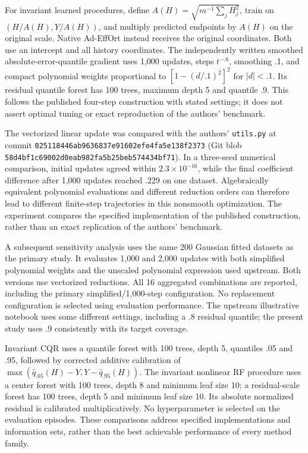 \documentclass[10pt]{article}
\begin{document}
For invariant learned procedures, define $A(H)=\sqrt{m^{-1}\sum_jH_j^2}$, train on $(H/A(H),Y/A(H))$, and multiply predicted endpoints by $A(H)$ on the original scale. Native Ad-EffOrt instead receives the original coordinates. Both use an intercept and all history coordinates. The independently written smoothed absolute-error-quantile gradient uses 1,000 updates, steps $t^{-.6}$, smoothing .1, and compact polynomial weights proportional to $[1-(d/.1)^2]^2$ for $|d|<.1$. Its residual quantile forest has 100 trees, maximum depth 5 and quantile .9. This follows the published four-step construction with stated settings; it does not assert optimal tuning or exact reproduction of the authors' benchmark.

The vectorized linear update was compared with the authors' \texttt{utils.py} at commit
\nolinkurl{025118446ab9636837e91602efe4fa5e138f2373}
(Git blob \nolinkurl{58d4bf1c69002d0eab982fa5b25beb574434bf71}). In a three-seed numerical comparison, initial updates agreed within $2.3\times10^{-16}$, while the final coefficient difference after 1,000 updates reached .229 on one dataset. Algebraically equivalent polynomial evaluations and different reduction orders can therefore lead to different finite-step trajectories in this nonsmooth optimization. The experiment compares the specified implementation of the published construction, rather than an exact replication of the authors' benchmark.

A subsequent sensitivity analysis uses the same 200 Gaussian fitted datasets as the primary study. It evaluates 1,000 and 2,000 updates with both simplified polynomial weights and the unscaled polynomial expression used upstream. Both versions use vectorized reductions. All 16 aggregated combinations are reported, including the primary simplified/1,000-step configuration. No replacement configuration is selected using evaluation performance. The upstream illustrative notebook uses some different settings, including a .8 residual quantile; the present study uses .9 consistently with its target coverage.

Invariant CQR uses a quantile forest with 100 trees, depth 5, quantiles .05 and .95, followed by corrected additive calibration of $\max(\hat q_{.05}(H)-Y,Y-\hat q_{.95}(H))$. The invariant nonlinear RF procedure uses a center forest with 100 trees, depth 8 and minimum leaf size 10; a residual-scale forest has 100 trees, depth 5 and minimum leaf size 10. Its absolute normalized residual is calibrated multiplicatively. No hyperparameter is selected on the evaluation episodes. These comparisons address specified implementations and information sets, rather than the best achievable performance of every method family.
\end{document}
